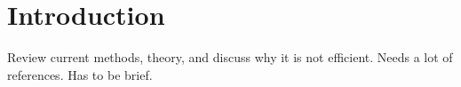\section{Introduction} \label{sec:intro}

Review current methods, theory, and discuss why it is not efficient. Needs a lot of references. Has to be brief.
